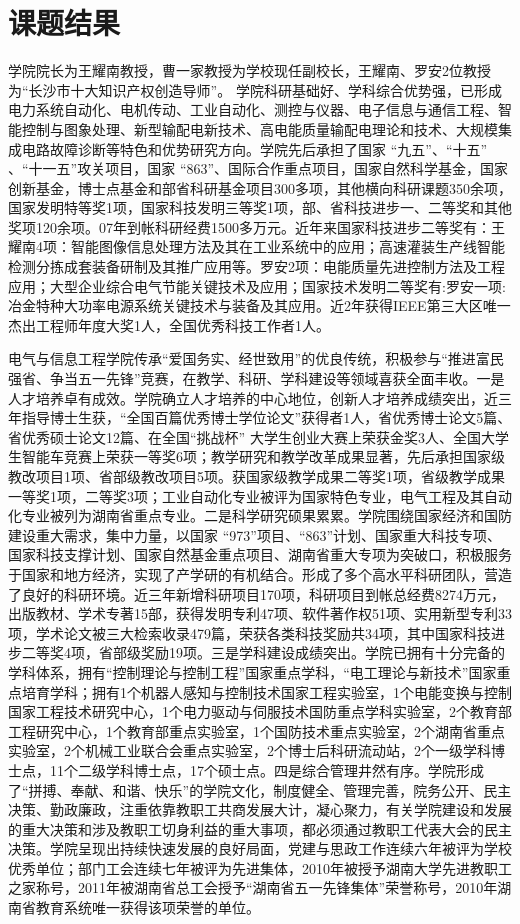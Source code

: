 \section{课题结果}
学院院长为王耀南教授，曹一家教授为学校现任副校长，王耀南、罗安2位教授为“长沙市十大知识产权创造导师”。
学院科研基础好、学科综合优势强，已形成电力系统自动化、电机传动、工业自动化、测控与仪器、电子信息与通信工程、智能控制与图象处理、新型输配电新技术、高电能质量输配电理论和技术、大规模集成电路故障诊断等特色和优势研究方向。学院先后承担了国家 “九五”、“十五” 、“十一五”攻关项目，国家 “863”、国际合作重点项目，国家自然科学基金，国家创新基金，博士点基金和部省科研基金项目300多项，其他横向科研课题350余项，国家发明特等奖1项，国家科技发明三等奖1项，部、省科技进步一、二等奖和其他奖项120余项。07年到帐科研经费1500多万元。近年来国家科技进步二等奖有：王耀南4项：智能图像信息处理方法及其在工业系统中的应用；高速灌装生产线智能检测分拣成套装备研制及其推广应用等。罗安2项：电能质量先进控制方法及工程应用；大型企业综合电气节能关键技术及应用；国家技术发明二等奖有:罗安一项:冶金特种大功率电源系统关键技术与装备及其应用。近2年获得IEEE第三大区唯一杰出工程师年度大奖1人，全国优秀科技工作者1人。

电气与信息工程学院传承“爱国务实、经世致用”的优良传统，积极参与“推进富民强省、争当五一先锋”竞赛，在教学、科研、学科建设等领域喜获全面丰收。一是人才培养卓有成效。学院确立人才培养的中心地位，创新人才培养成绩突出，近三年指导博士生获，“全国百篇优秀博士学位论文”获得者1人，省优秀博士论文5篇、省优秀硕士论文12篇、在全国“挑战杯” 大学生创业大赛上荣获金奖3人、全国大学生智能车竞赛上荣获一等奖6项；教学研究和教学改革成果显著，先后承担国家级教改项目1项、省部级教改项目5项。获国家级教学成果二等奖1项，省级教学成果一等奖1项，二等奖3项；工业自动化专业被评为国家特色专业，电气工程及其自动化专业被列为湖南省重点专业。二是科学研究硕果累累。学院围绕国家经济和国防建设重大需求，集中力量，以国家 “973”项目、“863”计划、国家重大科技专项、国家科技支撑计划、国家自然基金重点项目、湖南省重大专项为突破口，积极服务于国家和地方经济，实现了产学研的有机结合。形成了多个高水平科研团队，营造了良好的科研环境。近三年新增科研项目170项，科研项目到帐总经费8274万元，出版教材、学术专著15部，获得发明专利47项、软件著作权51项、实用新型专利33项，学术论文被三大检索收录479篇，荣获各类科技奖励共34项，其中国家科技进步二等奖4项，省部级奖励19项。三是学科建设成绩突出。学院已拥有十分完备的学科体系，拥有“控制理论与控制工程”国家重点学科，“电工理论与新技术”国家重点培育学科；拥有1个机器人感知与控制技术国家工程实验室，1个电能变换与控制国家工程技术研究中心，1个电力驱动与伺服技术国防重点学科实验室，2个教育部工程研究中心，1个教育部重点实验室，1个国防技术重点实验室，2个湖南省重点实验室，2个机械工业联合会重点实验室，2个博士后科研流动站，2个一级学科博士点，11个二级学科博士点，17个硕士点。四是综合管理井然有序。学院形成了“拼搏、奉献、和谐、快乐”的学院文化，制度健全、管理完善，院务公开、民主决策、勤政廉政，注重依靠教职工共商发展大计，凝心聚力，有关学院建设和发展的重大决策和涉及教职工切身利益的重大事项，都必须通过教职工代表大会的民主决策。学院呈现出持续快速发展的良好局面，党建与思政工作连续六年被评为学校优秀单位；部门工会连续七年被评为先进集体，2010年被授予湖南大学先进教职工之家称号，2011年被湖南省总工会授予“湖南省五一先锋集体”荣誉称号，2010年湖南省教育系统唯一获得该项荣誉的单位。
